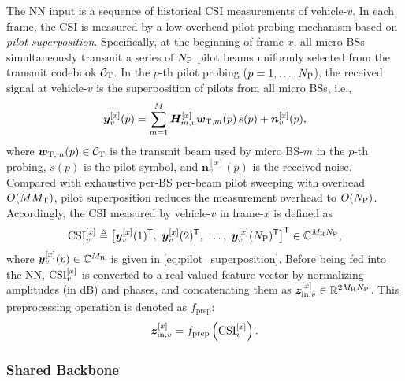 \documentclass[conference, a4paper]{IEEEtran}
\theoremstyle{remark}
\begin{document}
The NN input is a sequence of historical CSI measurements of vehicle-$v$. In each frame, the CSI is measured by a low-overhead pilot probing mechanism based on \emph{pilot superposition}.
Specifically, at the beginning of frame-$x$, all micro BSs simultaneously transmit a series of $N_{\rm P}$ pilot beams uniformly selected from the transmit codebook $\mathcal{C}_{\rm T}$. 
In the $p$-th pilot probing ($p=1,\dots,N_{\rm P}$), the received signal at vehicle-$v$ is the superposition of pilots from all micro BSs, i.e.,
\begin{equation}
\label{eq:pilot_superposition}
    \bm{y}_{v}^{[x]}(p)
    =
    \sum_{m=1}^{M} \boldsymbol{H}_{m,v}^{[x]} \bm{w}_{{\rm T},m}(p)\, s(p)
    + \bm{n}_{v}^{[x]}(p),
\end{equation}
where $\bm{w}_{{\rm T},m}(p)\in\mathcal{C}_{\rm T}$ is the transmit beam used by micro BS-$m$ in the $p$-th probing, $s(p)$ is the pilot symbol, and $\bm{n}_{v}^{[x]}(p)$ is the received noise.
Compared with exhaustive per-BS per-beam pilot sweeping with overhead $O(MM_{\rm T})$, pilot superposition reduces the measurement overhead to $O(N_{\rm P})$.
Accordingly, the CSI measured by vehicle-$v$ in frame-$x$ is defined as
\begin{equation}
\label{eq:CSI_stack}
    {\rm CSI}_v^{[x]} \triangleq 
    \big[ \bm{y}_{v}^{[x]}(1)^{\mathsf T},\ \bm{y}_{v}^{[x]}(2)^{\mathsf T},\ \dots,\ \bm{y}_{v}^{[x]}(N_{\rm P})^{\mathsf T} \big]^{\mathsf T}
    \in \mathbb{C}^{M_{\rm R}N_{\rm P}},
\end{equation}
where $\bm{y}_{v}^{[x]}(p)\in\mathbb{C}^{M_{\rm R}}$ is given in \eqref{eq:pilot_superposition}.
Before being fed into the NN, ${\rm CSI}_v^{[x]}$ is converted to a real-valued feature vector by normalizing amplitudes (in dB) and phases, and concatenating them as $\bm{z}_{\text{in},v}^{[x]} \in \mathbb{R}^{2M_{\rm R}N_{\rm P}}$. This preprocessing operation is denoted as $f_{\text{prep}}$:
\begin{equation}
\label{eq:preprocess_CSI}
    \bm{z}_{\text{in},v}^{[x]} = f_{\text{prep}} \left({\rm CSI}_v^{[x]} \right).
\end{equation}


\subsubsection{Shared Backbone}
\end{document}
